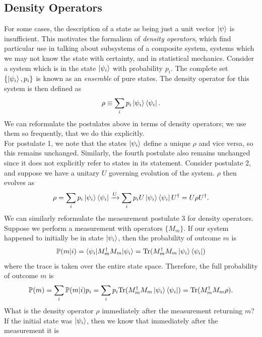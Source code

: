 \documentclass[12pt,a4paper]{report}
\numberwithin{equation}{section}
\newcommand{\ketbra}[2]{\ket{#1}\bra{#2}}
\newcommand{\ketbras}[1]{\ketbra{#1}{#1}}
\theoremstyle{definition}
\theoremstyle{theorem}
\theoremstyle{theorem}
\theoremstyle{example}
\theoremstyle{definition}
\begin{document}
\subsection{Density Operators}
For some cases, the description of a state as being just a unit vector $\ket{\psi}$ is insufficient. This motivates the formalism of \textit{density operators}, which find particular use in talking about subsystems of a composite system, systems which we may not know the state with certainty, and in statistical mechanics. Consider a system which is in the state $\ket{\psi_{i}}$ with probability $p_{i}$. The complete set $\{\ket{\psi_{i}},p_{i}\}$ is known as an \textit{ensemble} of pure states. The density operator for this system is then defined as
\begin{equation}
	\rho\equiv\sum_{i}p_{i}\ketbras{\psi_{i}}.
\end{equation}
We can reformulate the postulates above in terms of density operators; we use them so frequently, that we do this explicitly.\\
For postulate 1, we note that the states $\ket{\psi_{i}}$ define a unique $\rho$ and vice versa, so this remains unchanged. Similarly, the fourth postulate also remains unchanged since it does not explicitly refer to states in its statement. Consider postulate 2, and suppose we have a unitary $U$ governing evolution of the system. $\rho$ then evolves as
\begin{equation}
	\rho=\sum_{i}p_{i}\ketbras{\psi_{i}}\xrightarrow{U}\sum_{i}p_{i}U\ketbras{\psi_{i}}U^{\dagger}=U\rho U^{\dagger}.
\end{equation}
We can similarly reformulate the measurement postulate 3 for density operators. Suppose we perform a measurement with operators $\{M_{m}\}$. If our system happened to initially be in state $\ket{\psi_{i}}$, then the probability of outcome $m$ is
\begin{equation}
	\mathbb{P}(m|i)=\braket{\psi_{i}|M^{\dagger}_{m}M_{m}|\psi_{i}}=\text{Tr}(M_{m}^{\dagger}M_{m}\ketbras{\psi_{i}})
\end{equation}
where the trace is taken over the entire state space. Therefore, the full probability of outcome $m$ is
\begin{equation}
	\mathbb{P}(m)=\sum_{i}\mathbb{P}(m|i)p_{i}=\sum_{i}p_{i}\text{Tr}(M_{m}^{\dagger}M_{m}\ketbras{\psi_{i}})=\text{Tr}(M_{m}^{\dagger}M_{m}\rho).
\end{equation}
What is the density operator $\rho$ immediately after the measurement returning $m$? If the initial state was $\ket{\psi_{i}}$, then we know that immediately after the measurement it is
\end{document}
